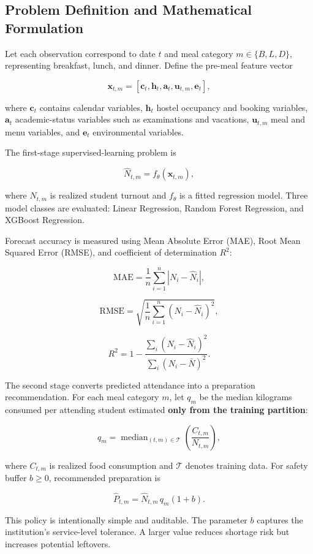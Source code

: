 \documentclass[conference]{IEEEtran}
\begin{document}
\subsection{Problem Definition and Mathematical
Formulation}\label{problem-definition-and-mathematical-formulation}

Let each observation correspond to date \(t\) and meal category
\(m\in\{B,L,D\}\), representing breakfast, lunch, and dinner. Define the
pre-meal feature vector

\[
\mathbf{x}_{t,m} = [\mathbf{c}_t,\mathbf{h}_t,\mathbf{a}_t,\mathbf{u}_{t,m},\mathbf{e}_t],
\]

where \(\mathbf{c}_t\) contains calendar variables, \(\mathbf{h}_t\)
hostel occupancy and booking variables, \(\mathbf{a}_t\) academic-status
variables such as examinations and vacations, \(\mathbf{u}_{t,m}\) meal
and menu variables, and \(\mathbf{e}_t\) environmental variables.

The first-stage supervised-learning problem is

\[
\hat{N}_{t,m}=f_{\theta}(\mathbf{x}_{t,m}),
\]

where \(N_{t,m}\) is realized student turnout and \(f_{\theta}\) is a
fitted regression model. Three model classes are evaluated: Linear
Regression, Random Forest Regression, and XGBoost Regression.

Forecast accuracy is measured using Mean Absolute Error (MAE), Root Mean
Squared Error (RMSE), and coefficient of determination \(R^2\):

\[
\mathrm{MAE}=\frac{1}{n}\sum_{i=1}^{n}|N_i-\hat{N}_i|,
\]

\[
\mathrm{RMSE}=\sqrt{\frac{1}{n}\sum_{i=1}^{n}(N_i-\hat{N}_i)^2},
\]

\[
R^2=1-\frac{\sum_i(N_i-\hat{N}_i)^2}{\sum_i(N_i-\bar{N})^2}.
\]

The second stage converts predicted attendance into a preparation
recommendation. For each meal category \(m\), let \(q_m\) be the median
kilograms consumed per attending student estimated \textbf{only from the
training partition}:

\[
q_m=\operatorname{median}_{(t,m)\in\mathcal{T}}
\left(\frac{C_{t,m}}{N_{t,m}}\right),
\]

where \(C_{t,m}\) is realized food consumption and \(\mathcal{T}\)
denotes training data. For safety buffer \(b\geq0\), recommended
preparation is

\[
\hat{P}_{t,m}=\hat{N}_{t,m}\,q_m(1+b).
\]

This policy is intentionally simple and auditable. The parameter \(b\)
captures the institution's service-level tolerance. A larger value
reduces shortage risk but increases potential leftovers.
\end{document}
